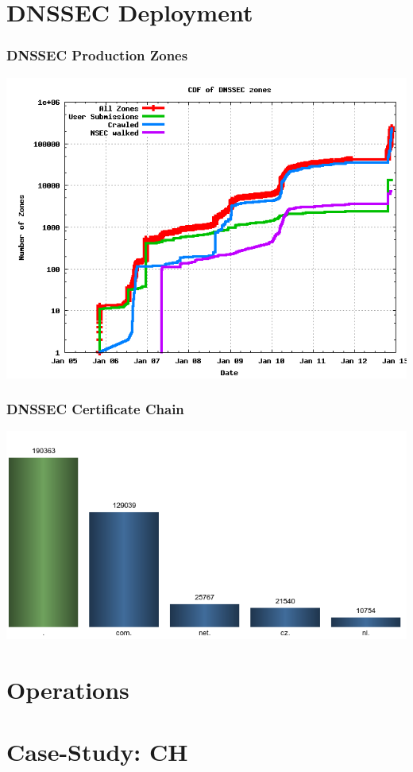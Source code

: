 \documentclass{beamer}
\begin{document}
\section{DNSSEC Deployment}

\begin{frame}
  \frametitle{DNSSEC Production Zones}
  \includegraphics[width=\textwidth]{dnssec-growth}
\end{frame}

\begin{frame}
  \frametitle{DNSSEC Certificate Chain}
  \includegraphics[width=\textwidth]{dnssec-on-tlds}

\end{frame}

\section{Operations}


\section{Case-Study: CH}
\end{document}
